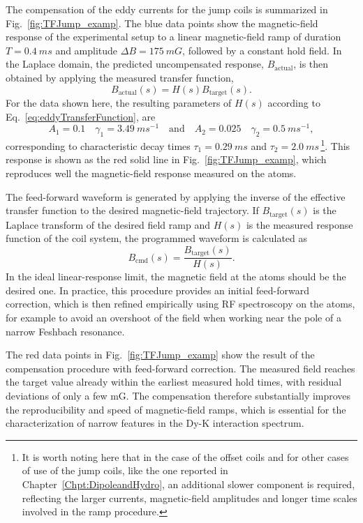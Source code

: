The compensation of the eddy currents for the jump coils is summarized in Fig.~\ref{fig:TFJump_examp}. The blue data points show the magnetic-field response of the experimental setup to a linear magnetic-field ramp of duration $T=\SI{0.4}{ms}$ and amplitude $\Delta B=\SI{175}{mG}$, followed by a constant hold field. In the Laplace domain, the predicted uncompensated response, $B_{\mathrm{actual}}$, is then obtained by applying the measured transfer function,
\begin{equation}
	B_{\mathrm{actual}}(s)=H(s)B_{\mathrm{target}}(s).
	\label{eq:predictedRamp}
\end{equation}
For the data shown here, the resulting parameters of $H(s)$ according to  Eq.~\eqref{eq:eddyTransferFunction}, are
\begin{equation}
	A_1={0.1} \quad \gamma_1=\SI{3.49}{ms^{-1}}\quad
	\text{and}\quad
	A_2={0.025} \quad \gamma_2=\SI{0.5}{ms^{-1}},
	\label{eq:EddySuppParam}
\end{equation}
corresponding to characteristic decay times $\tau_1=\SI{0.29}{ms}$ and $\tau_2=\SI{2.0}{ms}$\,\footnote{It is worth noting here that in the case of the offset coils and for other cases of use of the jump coils, like the one reported in Chapter~\ref{Chpt:DipoleandHydro}, an additional slower component is required, reflecting the larger currents, magnetic-field amplitudes and longer time scales involved in the ramp procedure.}.  
This response is shown as the red solid line in Fig.~\ref{fig:TFJump_examp}, which reproduces well the magnetic-field response measured on the atoms.

The feed-forward waveform is generated by applying the inverse of the effective transfer function to the desired magnetic-field trajectory. If $B_{\mathrm{target}}(s)$ is the Laplace transform of the desired field ramp and $H(s)$ is the measured response function of the coil system, the programmed waveform is calculated as
\begin{equation}
	B_{\mathrm{cmd}}(s)=\frac{B_{\mathrm{target}}(s)}{H(s)}.
\end{equation}
In the ideal linear-response limit, the magnetic field at the atoms should be the desired one. In practice, this procedure provides an initial feed-forward correction, which is then refined empirically using RF spectroscopy on the atoms, for example to avoid an overshoot of the field when working near the pole of a narrow Feshbach resonance. 	

The red data points in Fig.~\ref{fig:TFJump_examp} show the result of the compensation procedure with feed-forward correction. The measured field reaches the target value already within the earliest measured hold times, with residual deviations of only a few \unit{mG}. The compensation therefore substantially improves the reproducibility and speed of magnetic-field ramps, which is essential for the characterization of narrow features in the Dy-K interaction spectrum.


